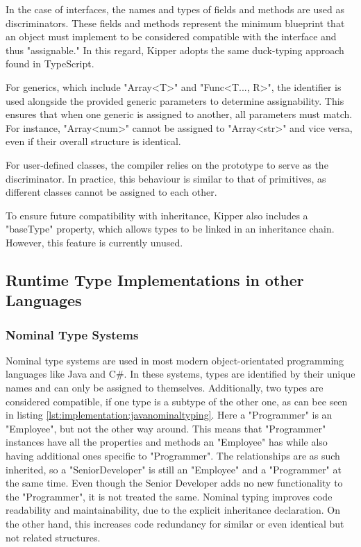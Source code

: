 In the case of interfaces, the names and types of fields and methods are used as discriminators. These fields and methods represent the minimum blueprint that an object must implement to be considered compatible with the interface and thus "assignable." In this regard, Kipper adopts the same duck-typing approach found in TypeScript.

For generics, which include "Array<T>" and "Func<T..., R>", the identifier is used alongside the provided generic parameters to determine assignability. This ensures that when one generic is assigned to another, all parameters must match. For instance, "Array<num>" cannot be assigned to "Array<str>" and vice versa, even if their overall structure is identical.

For user-defined classes, the compiler relies on the prototype to serve as the discriminator. In practice, this behaviour is similar to that of primitives, as different classes cannot be assigned to each other.

To ensure future compatibility with inheritance, Kipper also includes a "baseType" property, which allows types to be linked in an inheritance chain. However, this feature is currently unused.

\subsection{Runtime Type Implementations in other Languages}
\label{chap:runtime-other-languages}

\subsubsection{Nominal Type Systems}

Nominal type systems are used in most modern object-orientated programming languages like Java and C\#. In these systems, types are identified by their unique names and can only be assigned to themselves. Additionally, two types are considered compatible, if one type is a subtype of the other one, as can bee seen in listing \ref{lst:implementation:javanominaltyping}. Here a "Programmer" is an "Employee", but not the other way around. This means that "Programmer" instances have all the properties and methods an "Employee" has while also having additional ones specific to "Programmer". The relationships are as such inherited, so a "SeniorDeveloper" is still an "Employee" and a "Programmer" at the same time. Even though the Senior Developer adds no new functionality to the "Programmer", it is not treated the same. Nominal typing improves code readability and maintainability, due to the explicit inheritance declaration. On the other hand, this increases code redundancy for similar or even identical but not related structures.

